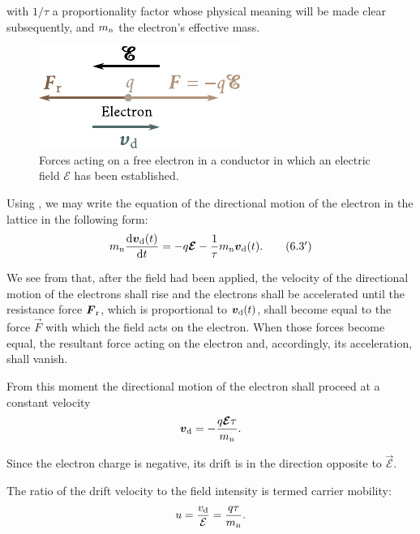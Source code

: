 \noindent
with $1/\tau$ a proportionality factor whose physical meaning will be made clear subsequently, and $m_{\text{n}}$ the electron's effective mass.

\begin{figure}[t]
	\begin{center}
		\includegraphics[scale=1]{figures/ch_06/fig_6_2.pdf}
		\caption[]{Forces acting on a free electron in a conductor in which an electric field $\mathcal{E}$ has been established.}
		\label{fig:6_2}
	\end{center}
	\vspace{-0.7cm}
\end{figure}

Using , we may write the equation of the directional motion of the electron in the lattice in the following form:
\begin{equation}\label{eq:6_3p}
    m_{\text{n}} \dfrac{\mathrm{d}\boldsymbol{v}_{\text{d}}(t)}{\mathrm{d} t} = -q\boldsymbol{\mathcal{E}} - \frac{1}{\tau} m_{\text{n}} \boldsymbol{v}_{\text{d}}(t). \tag{6.3$'$}
\end{equation}

We see from  that, after the field had been applied, the velocity of the directional motion of the electrons shall rise and the electrons shall be accelerated until the resistance force $\boldsymbol{F}_{\text{r}}$, which is proportional to $\boldsymbol{v}_{\text{d}}(t)$, shall become equal to the force $\vec{F}$ with which the field acts on the electron. When those forces become equal, the resultant force acting on the electron and, accordingly, its acceleration, shall vanish.

From this moment the directional motion of the electron shall proceed at a constant velocity
\begin{equation}\label{eq:6_4}
    \boldsymbol{v}_{\text{d}} = - \frac{q \boldsymbol{\mathcal{E}} \tau}{m_{\text{n}}}.
\end{equation}

\noindent
Since the electron charge is negative, its drift is in the direction opposite to $\vec{\mathcal{E}}$.

The ratio of the drift velocity to the field intensity is termed carrier mobility:
\begin{equation}\label{eq:6_5}
    u = \frac{v_{\text{d}}}{\mathcal{E}} = \frac{q\tau}{m_{\text{n}}}.
\end{equation}

